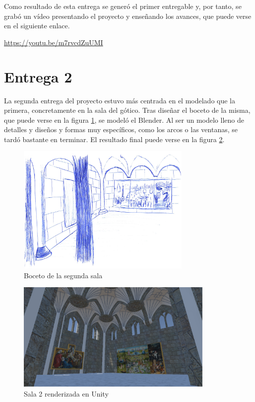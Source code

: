 Como resultado de esta entrega se generó el primer entregable y, por tanto, se grabó un vídeo presentando el proyecto y enseñando los avances, que puede verse en el siguiente enlace.

\begin{center}
    \url{https://youtu.be/m7rvcdZuUMI}
\end{center}



\section{Entrega 2}

La segunda entrega del proyecto estuvo más centrada en el modelado que la primera, concretamente en la sala del gótico. Tras diseñar el boceto de la misma, que puede verse en la figura \ref{fig:bocetos-sala-2}, se modeló el Blender. Al ser un modelo lleno de detalles y diseños y formas muy específicos, como los arcos o las ventanas, se tardó bastante en terminar. El resultado final puede verse en la figura \ref{fig:unity-sala-2}.

\begin{figure}[!h]
\begin{center}
\includegraphics[width=0.75\textwidth]{imagenes/7/bocetos/boceto-sala-2.png}
\caption{Boceto de la segunda sala}
\label{fig:bocetos-sala-2}
\end{center}
\end{figure}

\begin{figure}[!h]
\begin{center}
\includegraphics[width=0.85\textwidth]{imagenes/7/salas-unity/unity-sala-2.png}
\caption{Sala 2 renderizada en Unity}
\label{fig:unity-sala-2}
\end{center}
\end{figure}

